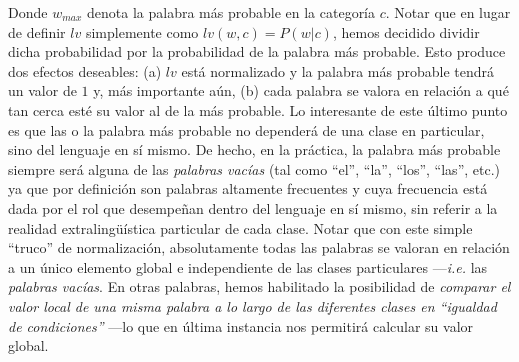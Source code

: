 Donde $w_{max}$ denota la palabra más probable en la categoría $c$.
Notar que en lugar de definir $lv$ simplemente como $lv(w, c) = P(w|c)$, hemos decidido dividir dicha probabilidad por la probabilidad de la palabra más probable.
Esto produce dos efectos deseables:
(a) $lv$ está normalizado y la palabra más probable tendrá un valor de $1$ y, más importante aún,
(b) cada palabra se valora en relación a qué tan cerca esté su valor al de la más probable.
Lo interesante de este último punto es que las o la palabra más probable no dependerá de una clase en particular, sino del lenguaje en sí mismo. De hecho, en la práctica, la palabra más probable siempre será alguna de las \emph{palabras vacías} (tal como ``el'', ``la'', ``los'', ``las'', etc.) ya que por definición son palabras altamente frecuentes y cuya frecuencia está dada por el rol que desempeñan dentro del lenguaje en sí mismo, sin referir a la realidad extralingüística particular de cada clase.
Notar que con este simple ``truco'' de normalización, absolutamente todas las palabras se valoran en relación a un único elemento global e independiente de las clases particulares ---\emph{i.e.} las \emph{palabras vacías}. En otras palabras, hemos habilitado la posibilidad de \emph{comparar el valor local de una misma palabra a lo largo de las diferentes clases en ``igualdad de condiciones''} ---lo que en última instancia nos permitirá calcular su valor global.

